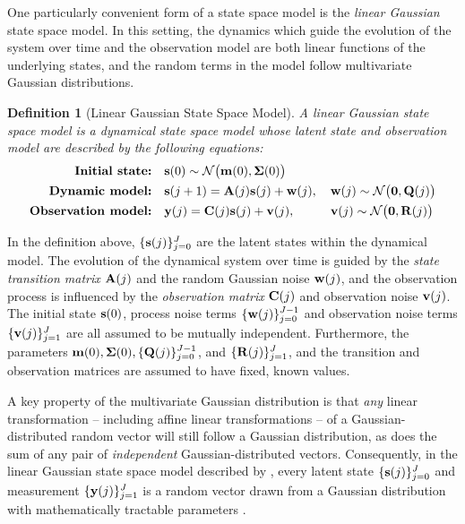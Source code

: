 \documentclass[10pt]{article}
\newtheorem{definition}{Definition}
\begin{document}
One particularly convenient form of a state space model is the \emph{linear Gaussian} state space model. In this setting, the dynamics which guide the evolution of the system over time and the observation model are both linear functions of the underlying states, and the random terms in the model follow multivariate Gaussian distributions.

\begin{definition}[Linear Gaussian State Space Model]
\label{def:LGSSM}
    A linear Gaussian state space model is a dynamical state space model whose latent state and observation model are described by the following equations:
    \begin{subequations}
        \label{eq:LGSSM-dynamics}
        \begin{align}
            \textnormal{\textbf{Initial state:}} \quad & \bfs(0) \sim \calN\big(\bfm(0), \bfSigma(0)\big) && \label{eq:LGSSM-init}\\%
            \textnormal{\textbf{Dynamic model:}} \quad & \bfs(j+1) = \bfA(j)\bfs(j) + \bfw(j), \, && \bfw(j) \sim \calN\big(\mathbf{0}, \bfQ(j)\big) \label{eq:LGSSM-evolution}\\%
            \textnormal{\textbf{Observation model:}} \quad & \bfy(j) = \bfC(j)\bfs(j) + \bfv(j), \, && \bfv(j) \sim \calN\big(\mathbf{0}, \bfR(j)\big) \label{eq:LGSSM-observe}
        \end{align}
    \end{subequations}
\end{definition}
In the definition above, $\{\mathbf{s}(j)\}_{j=0}^{J}$ are the latent states within the dynamical model. The evolution of the dynamical system over time is guided by the \emph{state transition matrix} $\mathbf{A}(j)$ and the random Gaussian noise $\mathbf{w}(j)$, and the observation process is influenced by the \emph{observation matrix} $\mathbf{C}(j)$ and observation noise $\mathbf{v}(j)$. The initial state $\mathbf{s}(0)$, process noise terms $\{\mathbf{w}(j)\}_{j=0}^{J-1}$ and observation noise terms $\{\mathbf{v}(j)\}_{j=1}^{J}$ are all assumed to be mutually independent. Furthermore, the parameters $\mathbf{m}(0), \bm{\Sigma}(0), \{\mathbf{Q}(j)\}_{j=0}^{J-1}$, and $\{\mathbf{R}(j)\}_{j=1}^{J}$, and the transition and observation matrices are assumed to have fixed, known values. 

A key property of the multivariate Gaussian distribution is that \emph{any} linear transformation -- including affine linear transformations -- of a Gaussian-distributed random vector will still follow a Gaussian distribution, as does the sum of any pair of \emph{independent} Gaussian-distributed vectors. Consequently, in the linear Gaussian state space model described by , every latent state $\{\mathbf{s}(j)\}_{j=0}^{J}$ and measurement $\{\mathbf{y}(j)\}_{j=1}^{J}$ is a random vector drawn from a Gaussian distribution with mathematically tractable parameters \citep{Bayesian-Filter-Book-2023}.
\end{document}
